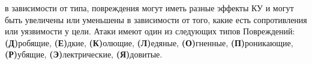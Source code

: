 в зависимости от типа, повреждения могут иметь разные эффекты КУ и могут быть увеличены или уменьшены в зависимости от того, какие есть сопротивления или уязвимости у цели. Атаки имеют один из следующих типов Повреждений:
\newline \textbf{(Д)}робящие, \textbf{(Е)}дкие, \textbf{(К)}олющие, \textbf{(Л)}едяные, \textbf{(О)}гненные, \textbf{(П)}роникающие, \textbf{(Р)}убящие, \textbf{(Э)}лектрические, \textbf{(Я)}довитые.